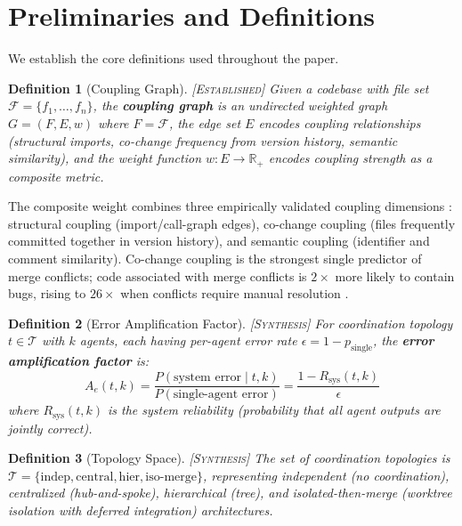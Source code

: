 \documentclass[11pt, a4paper, copyright]{googledeepmind}
\newtheorem{definition}{Definition}[section]
\newcommand{\established}{\textsc{[Established]}}
\newcommand{\synthesis}{\textsc{[Synthesis]}}
\begin{document}
\section{Preliminaries and Definitions}
\label{sec:prelim}

We establish the core definitions used throughout the paper.

\begin{definition}[Coupling Graph] \established{}
\label{def:coupling-graph}
Given a codebase with file set $\mathcal{F} = \{f_1, \ldots, f_n\}$, the \textbf{coupling graph} is an undirected weighted graph $G = (F, E, w)$ where $F = \mathcal{F}$, the edge set $E$ encodes coupling relationships (structural imports, co-change frequency from version history, semantic similarity), and the weight function $w: E \to \mathbb{R}_+$ encodes coupling strength as a composite metric.
\end{definition}

The composite weight combines three empirically validated coupling dimensions \citep{Martin1994, KasiSarma2013, Accioly2018}: structural coupling (import/call-graph edges), co-change coupling (files frequently committed together in version history), and semantic coupling (identifier and comment similarity).
Co-change coupling is the strongest single predictor of merge conflicts; code associated with merge conflicts is $2\times$ more likely to contain bugs, rising to $26\times$ when conflicts require manual resolution \citep{Accioly2018}.

\begin{definition}[Error Amplification Factor] \synthesis{}
\label{def:error-amp}
For coordination topology $t \in \mathcal{T}$ with $k$ agents, each having per-agent error rate $\epsilon = 1 - p_{\mathrm{single}}$, the \textbf{error amplification factor} is:
\begin{equation}
  A_e(t, k) = \frac{P(\text{system error} \mid t, k)}{P(\text{single-agent error})} = \frac{1 - R_{\mathrm{sys}}(t, k)}{\epsilon}
\end{equation}
where $R_{\mathrm{sys}}(t, k)$ is the system reliability (probability that all agent outputs are jointly correct).
\end{definition}

\begin{definition}[Topology Space] \synthesis{}
\label{def:topology}
The set of coordination topologies is $\mathcal{T} = \{\mathrm{indep}, \mathrm{central}, \mathrm{hier}, \mathrm{iso\text{-}merge}\}$, representing independent (no coordination), centralized (hub-and-spoke), hierarchical (tree), and isolated-then-merge (worktree isolation with deferred integration) architectures.
\end{definition}
\end{document}
